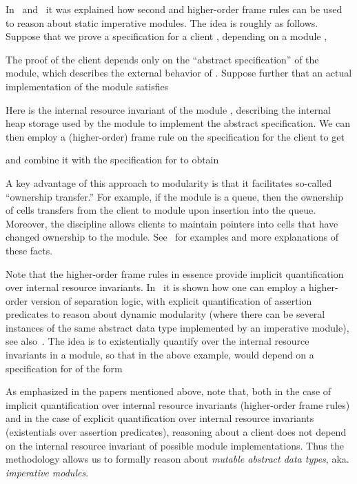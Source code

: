 \documentclass{LMCS}
\begin{document}
In~\cite{yang-ohearn-reynolds-popl04}
and~\cite{birkedal-torpsmith-yang-lics05}
it was explained how second and higher-order frame rules can be used
to reason about static imperative modules. The idea is roughly as
follows. Suppose that
we prove a specification for a client , depending
on a module ,

The proof of the client depends only on the ``abstract specification''
of the module, which describes the external behavior of . 
Suppose further that an actual implementation 
 of the module satisfies

Here  is the internal resource invariant of the module , describing
the internal heap storage used by the module  to implement the abstract
specification. We can then employ a (higher-order) frame rule on the specification for the
client to get

and combine it with the specification for  to obtain

A key advantage of this approach to modularity is that it facilitates
so-called ``ownership transfer.'' For example, if the module is a queue, 
then the ownership of cells transfers from the client to module upon
insertion into the queue. Moreover, the discipline allows clients to
maintain pointers into cells that have changed ownership to the module. 
See~\cite{yang-ohearn-reynolds-popl04} for examples and more explanations
of these facts.

Note that the higher-order frame rules in essence provide implicit
quantification over internal resource invariants.
In~\cite{biering-birkedal-torpsmith-esop05}
it is shown how one can employ a higher-order version of separation logic,
with explicit quantification of assertion predicates to reason about dynamic
modularity (where there can be several instances of the same abstract data
type implemented by an imperative module), see
also~\cite{parkinson-bierman-popl05}. The idea is to
existentially quantify over the internal resource invariants in
a module, so that in the above example,
 would depend on a specification for  of the form

As emphasized in the papers mentioned above, note that,
both in the case of implicit quantification over internal resource
invariants (higher-order frame rules) and in the case of explicit
quantification over internal resource invariants (existentials over
assertion predicates), reasoning about a client does not depend on the
internal resource invariant of possible module implementations.
Thus the methodology allows us to formally reason about \emph{mutable
abstract data types}, aka. \emph{imperative modules}.
\end{document}
